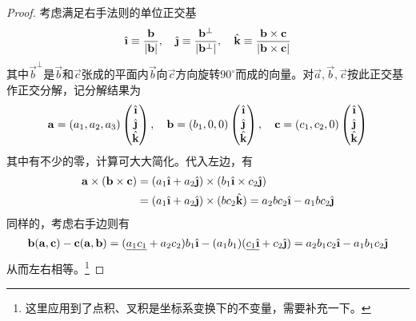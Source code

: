 \begin{proof}
  考虑满足右手法则的单位正交基
  \begin{align*}
    \ihat \equiv \frac{\vec b}{\left|\vec b\right|},\quad
    \jhat \equiv \frac{\vec b^\perp}{\left|\vec b^\perp\right|},\quad
    \khat \equiv \frac{\vec b\times \vec c}{\left|\vec b\times\vec c\right|}
  \end{align*}
  其中$\vec b^\perp$是$\vec b$和$\vec c$张成的平面内$\vec b$向$\vec c$方向旋转$90^\circ$而成的向量。对$\vec a,\vec b,\vec c$按此正交基作正交分解，记分解结果为
  \begin{align*}
    \vec a=(a_1, a_2, a_3)\begin{pmatrix}\ihat\\ \jhat\\ \khat\end{pmatrix}, \quad
    \vec b=(b_1,   0,   0)\begin{pmatrix}\ihat\\ \jhat\\ \khat\end{pmatrix}, \quad
    \vec c=(c_1, c_2,   0)\begin{pmatrix}\ihat\\ \jhat\\ \khat\end{pmatrix}
  \end{align*}
  其中有不少的零，计算可大大简化。代入左边，有
  \begin{align*}
    \vec a\times(\vec b\times\vec c) ={}& (a_1\ihat + a_2\jhat)\times(b_1\ihat \times c_2\jhat)\\
    ={}& (a_1\ihat + a_2\jhat)\times(bc_2\khat) = a_2bc_2\ihat - a_1bc_2\jhat
  \end{align*}
  同样的，考虑右手边则有
  \begin{align*}
    \vec b(\vec a,\vec c) - \vec c(\vec a,\vec b) = (\underline{a_1c_1} + a_2c_2) b_1\ihat  - (a_1b_1)(\underline{c_1\ihat} + c_2\jhat)
    =a_2b_1c_2\ihat - a_1b_1c_2\jhat
  \end{align*}
  从而左右相等。\footnote{这里应用到了点积、叉积是坐标系变换下的不变量，需要补充一下。}
\end{proof}


